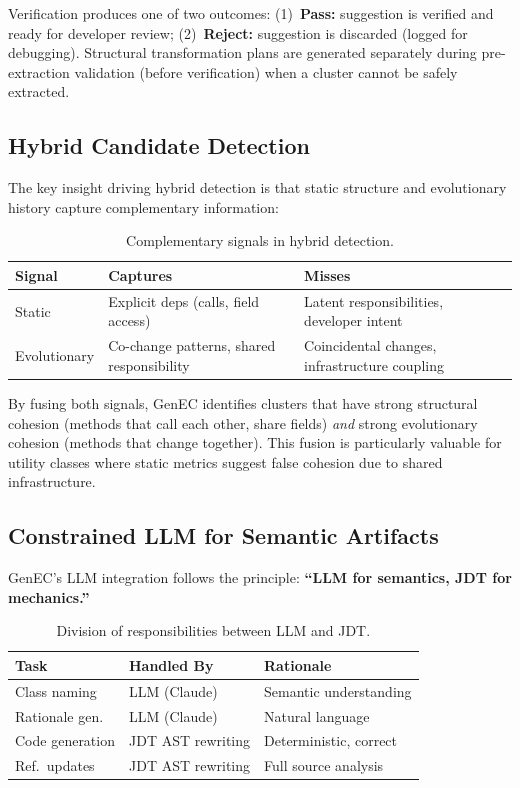 \documentclass[sigconf]{acmart}
\begin{document}
Verification produces one of two outcomes: (1)~\textbf{Pass:} suggestion is
verified and ready for developer review; (2)~\textbf{Reject:} suggestion is
discarded (logged for debugging). Structural transformation plans are generated
separately during pre-extraction validation (before verification) when a
cluster cannot be safely extracted.

\subsection{Hybrid Candidate Detection}
\label{sec:hybrid}

The key insight driving hybrid detection is that static structure and
evolutionary history capture complementary information:

\begin{table}[htbp]
\centering\small
\caption{Complementary signals in hybrid detection.}
\label{tab:signals}
\begin{tabularx}{\columnwidth}{@{}lXX@{}}
\toprule
\textbf{Signal} & \textbf{Captures} & \textbf{Misses} \\
\midrule
Static & Explicit deps (calls, field access) & Latent responsibilities, developer intent \\
Evolutionary & Co-change patterns, shared responsibility & Coincidental changes, infrastructure coupling \\
\bottomrule
\end{tabularx}
\end{table}

By fusing both signals, GenEC identifies clusters that have strong structural
cohesion (methods that call each other, share fields) \emph{and} strong
evolutionary cohesion (methods that change together). This fusion is
particularly valuable for utility classes where static metrics suggest false
cohesion due to shared infrastructure.

\subsection{Constrained LLM for Semantic Artifacts}
\label{sec:constrained-llm}

GenEC's LLM integration follows the principle: \textbf{``LLM for semantics,
JDT for mechanics.''}

\begin{table}[htbp]
\centering\small
\caption{Division of responsibilities between LLM and JDT.}
\label{tab:llm-jdt}
\begin{tabularx}{\columnwidth}{@{}lXl@{}}
\toprule
\textbf{Task} & \textbf{Handled By} & \textbf{Rationale} \\
\midrule
Class naming & LLM (Claude) & Semantic understanding \\
Rationale gen. & LLM (Claude) & Natural language \\
Code generation & JDT AST rewriting & Deterministic, correct \\
Ref.\ updates & JDT AST rewriting & Full source analysis \\
\bottomrule
\end{tabularx}
\end{table}
\end{document}
